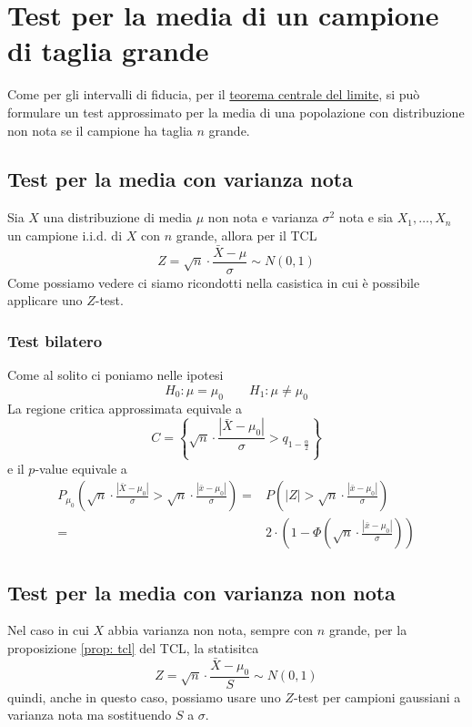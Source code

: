 \section{Test per la media di un campione di taglia grande}
Come per gli intervalli di fiducia, per il \hyperref[th: tcl]{teorema centrale del limite}, si può
formulare un test approssimato per la media di una popolazione con distribuzione non nota se il
campione ha taglia $n$ grande.

\subsection{Test per la media con varianza nota}
Sia $X$ una distribuzione di media $\mu$ non nota e varianza $\sigma^2$ nota e sia
$X_1, \dots, X_n$ un campione i.i.d. di $X$ con $n$ grande, allora per il TCL
\[ Z = \sqrt{n} \cdot \frac{\bar{X} - \mu}{\sigma} \sim N(0,1) \]
Come possiamo vedere ci siamo ricondotti nella casistica in cui è possibile applicare uno $Z$-test.

\subsubsection{Test bilatero}
Come al solito ci poniamo nelle ipotesi
\[ H_0 : \mu = \mu_0 \qquad H_1 : \mu \neq \mu_0 \]
La regione critica approssimata equivale a
\[ C = \left\{ \sqrt{n} \cdot \frac{|\bar{X} - \mu_0|}{\sigma} > q_{1 - \frac{\alpha}{2}} \right\} \]
e il $p$-value equivale a
\begin{align*}
	P_{\mu_0} \left( \sqrt{n} \cdot \frac{|\bar{X} - \mu_0|}{\sigma} >
	\sqrt{n} \cdot \frac{|\bar{x} - \mu_0|}{\sigma} \right) = &
	P \left( |Z| > \sqrt{n} \cdot \frac{|\bar{x} - \mu_0|}{\sigma} \right) \\
	=                                                         &
	2 \cdot \left( 1 - \Phi \left( \sqrt{n} \cdot \frac{|\bar{x} - \mu_0|}{\sigma} \right) \right)
\end{align*}

\subsection{Test per la media con varianza non nota}
Nel caso in cui $X$ abbia varianza non nota, sempre con $n$ grande, per la proposizione
\ref{prop: tcl} del TCL, la statisitca
\[ Z = \sqrt{n} \cdot \frac{\bar{X} - \mu_0}{S} \sim N(0,1) \]
quindi, anche in questo caso, possiamo usare uno $Z$-test per campioni gaussiani a varianza nota
ma sostituendo $S$ a $\sigma$.


